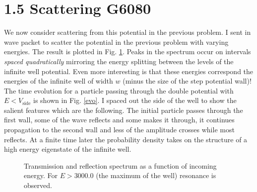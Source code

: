 \documentclass[singlepage,notitlepage,nofootinbib,11pt]{revtex4-1}
\begin{document}
\section*{1.5 Scattering G6080}
We now consider scattering from this potential in the previous problem. I sent in wave packet to scatter the potential in the previous problem with varying energies. The result is plotted in Fig. \ref{resonance}. Peaks in the spectrum occur on intervals {\it spaced quadratically} mirroring the energy splitting between the levels of the infinite well potential. Even more interesting is that these energies correspond the energies of the infinite well of width $w$ (minus the size of the step potential wall)! The time evolution for a particle passing through the double potential with $E<V_{\text{side}}$ is shown in Fig. \ref{evo}. I spaced out the side of the well to show the salient features which are the following. The initial particle passes through the first wall, some of the wave reflects and some makes it through, it continues propagation to the second wall and less of the amplitude crosses while most reflects. At a finite time later the probability density takes on the structure of a high energy eigenstate of the infinite well.
\begin{figure}[h]
  \centering
  \captionsetup[subfigure]{labelformat=empty}
  \caption{\label{resonance} Transmission and reflection spectrum as a function of incoming energy. For $E>3000.0$ (the maximum of the well) resonance is observed.}
\end{figure}
\end{document}
